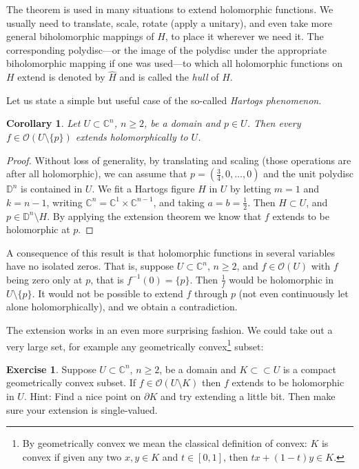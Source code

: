 \documentclass[12pt,openany]{book}
\newcommand{\C}{{\mathbb{C}}}
\newcommand{\D}{{\mathbb{D}}}
\newcommand{\sO}{{\mathcal{O}}}
\newcommand{\myindex}[1]{#1\index{#1}}
\theoremstyle{plain}
\newtheorem{cor}[thm]{Corollary}
\theoremstyle{remark}
\theoremstyle{definition}
\newenvironment{exbox}{%
    \def\FrameCommand{\vrule width 1pt \relax\hspace {10pt}}%
    \MakeFramed {\advance \hsize -\width \FrameRestore }%
}{%
    \endMakeFramed
}
\theoremstyle{exercise}
\newtheorem{exercise}{Exercise}[section]
\theoremstyle{example}
\begin{document}
The theorem is used 
in many situations to extend holomorphic functions.
We usually need to
translate, scale, 
rotate (apply a unitary), and even take more general biholomorphic mappings
of $H$, to place it wherever we need it.  The corresponding polydisc---or the image of
the polydisc under the appropriate biholomorphic mapping if one was
used---to which all holomorphic functions on $H$ extend is denoted
by $\widehat{H}$ and is called the \emph{hull} of $H$.%

Let us state a simple but useful case of the so-called
\emph{\myindex{Hartogs phenomenon}}.

\begin{cor}
Let $U \subset \C^n$, $n \geq 2$, be a domain and $p \in U$.  Then every $f \in \sO(U
\setminus \{ p \} )$ extends holomorphically to $U$.
\end{cor}

\begin{proof}
Without loss of generality,
by translating and scaling (those operations are after all holomorphic),
we can assume that $p = (\frac{3}{4},0,\ldots,0)$
and the unit polydisc $\D^n$ is contained in $U$.  We fit a Hartogs figure $H$
in $U$
by letting $m=1$ and $k=n-1$, writing $\C^n = \C^{1} \times \C^{n-1}$,
and taking $a = b = \frac{1}{2}$.
Then $H \subset U$, and $p \in \D^n \setminus H$.  By applying the extension
theorem we know that $f$ extends to be holomorphic at $p$.
\end{proof}

A consequence of this result is that holomorphic functions in several
variables have no isolated zeros.  That is, suppose $U \subset \C^n$,
$n \geq 2$, and $f \in \sO(U)$ with $f$ being zero only at $p$, that
is $f^{-1}(0) = \{ p \}$.  Then $\frac{1}{f}$ would be holomorphic in
$U \setminus \{ p \}$.  It would not be possible to extend $f$
through $p$ (not even continuously let alone holomorphically),
and we obtain a contradiction.

The extension works in an even more surprising fashion.  We could
take out a very large set, for example any geometrically
convex\footnote{By geometrically convex we mean the classical
definition of convex: $K$ is convex if given any two $x,y \in K$ and $t \in [0,1]$,
then $t x + (1-t)y \in K$.} subset:

\begin{exbox}
\begin{exercise} \label{exercise:convexhartogs}
Suppose $U \subset \C^n$, $n \geq 2$, be a domain and $K \subset \subset U$
is a compact geometrically
convex subset.
If $f \in \sO(U \setminus K)$
then $f$ extends to be holomorphic in $U$.
Hint: Find a nice point on $\partial K$ and try extending a little bit.
Then make sure your extension is single-valued.
\end{exercise}
\end{exbox}
\end{document}
